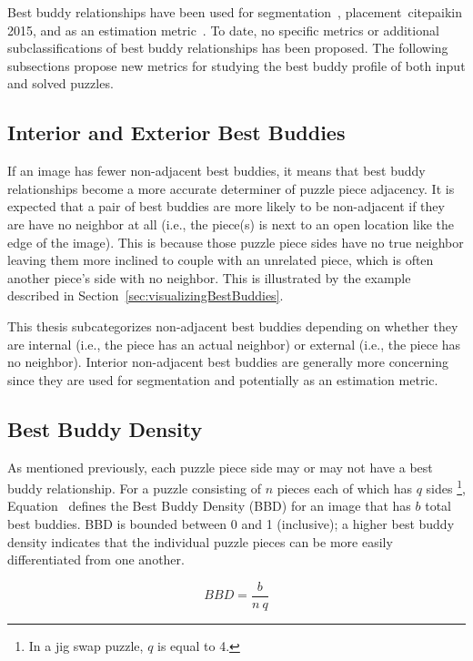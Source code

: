 Best buddy relationships have been used for segmentation~\cite{pomeranz2011}, placement~cite{paikin 2015}, and as an estimation metric~\cite{sholomon2013}.  To date, no specific metrics or additional subclassifications of best buddy relationships has been proposed.  The following subsections propose new metrics for studying the best buddy profile of both input and solved puzzles.

\subsection{Interior and Exterior Best Buddies}\label{sec:bestBuddyInteriorExterior}

If an image has fewer non-adjacent best buddies, it means that best buddy relationships become a more accurate determiner of puzzle piece adjacency.  It is expected that a pair of best buddies are more likely to be non-adjacent if they are have no neighbor at all (i.e., the piece(s) is next to an open location like the edge of the image).  This is because those puzzle piece sides have no true neighbor leaving them more inclined to couple with an unrelated piece, which is often another piece's side with no neighbor.  This is illustrated by the example described in Section~\ref{sec:visualizingBestBuddies}.

This thesis subcategorizes non-adjacent best buddies depending on whether they are internal (i.e., the piece has an actual neighbor) or external (i.e., the piece has no neighbor).  Interior non-adjacent best buddies are generally more concerning since they are used for segmentation and potentially as an estimation metric. 

\subsection{Best Buddy Density}\label{sec:bestBuddyDensity}

As mentioned previously, each puzzle piece side may or may not have a best buddy relationship. For a puzzle consisting of $n$ pieces each of which has $q$ sides \footnote{In a jig swap puzzle, $q$ is equal to 4.}, Equation~ defines the Best Buddy Density (BBD) for an image that has $b$ total best buddies.   BBD is bounded between 0 and 1 (inclusive); a higher best buddy density indicates that the individual puzzle pieces can be more easily differentiated from one another.  

\begin{equation} \label{eq:bestBuddyDensity}
BBD = \frac{b}{n~q}
\end{equation}

